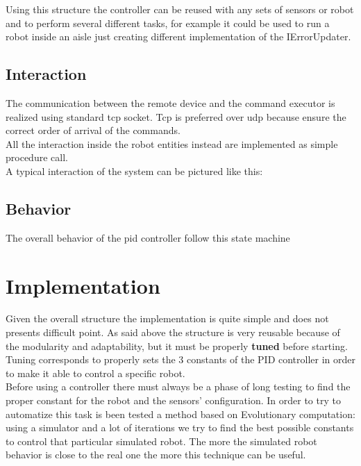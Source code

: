 \documentclass{llncs}
\newcommand{\labelsec}[1]{\label{sec:#1}}
\begin{document}
\noindent Using this structure the controller can be reused with any sets of sensors or robot and to perform several different tasks, for example it could be used to run a robot inside an aisle just creating different implementation of the IErrorUpdater.\\

\subsection{Interaction}
The communication between the remote device and the command executor is realized using standard tcp socket. Tcp is preferred over udp because ensure the correct order of arrival of the commands.\\
All the interaction inside the robot entities instead are implemented as simple procedure call. \\
A typical interaction of the system can be pictured like this:
\begin{center}
\end{center}


\subsection{Behavior}
The overall behavior of the pid controller follow this state machine 
\begin{center}
\end{center}

\newpage
\section{Implementation}
\labelsec{Implementation}
Given the overall structure the implementation is quite simple and does not presents difficult point.  
As said above the structure is very reusable because of the modularity and adaptability, but it must be properly \textbf{tuned} before starting. Tuning corresponds to properly sets the 3 constants of the PID controller in order to make it able to control a specific robot.\\

\noindent Before using a controller there must always be a phase of long testing to find the proper constant for the robot and the sensors' configuration. In order to try to automatize this task is been tested a method based on Evolutionary computation: using a simulator and a lot of iterations we try to find the best possible constants to control that particular simulated robot. The more the simulated robot behavior is close to the real one the more this technique can be useful. \\
\end{document}
